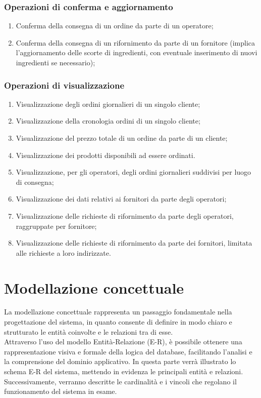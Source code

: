 \documentclass[12pt,a4paper]{article}
\begin{document}
    \subsubsection{Operazioni di conferma e aggiornamento}
    \begin{enumerate}[leftmargin=2.8em,label=\textbf{Op.\arabic*}]
        \item Conferma della consegna di un ordine da parte di un operatore;
        \item Conferma della consegna di un rifornimento da parte di un fornitore (implica l'aggiornamento delle scorte di ingredienti, con eventuale inserimento di nuovi ingredienti se necessario);
    \end{enumerate}

    \subsubsection{Operazioni di visualizzazione}
    \begin{enumerate}[leftmargin=2.8em,label=\textbf{Op.\arabic*}]
        \item Visualizzazione degli ordini giornalieri di un singolo cliente;
        \item Visualizzazione della cronologia ordini di un singolo cliente;
        \item Visualizzazione del prezzo totale di un ordine da parte di un cliente;
        \item Visualizzazione dei prodotti disponibili ad essere ordinati.
        \item Visualizzazione, per gli operatori, degli ordini giornalieri suddivisi per luogo di consegna;
        \item Visualizzazione dei dati relativi ai fornitori da parte degli operatori;
        \item Visualizzazione delle richieste di rifornimento da parte degli operatori, raggruppate per fornitore;
        \item Visualizzazione delle richieste di rifornimento da parte dei fornitori, limitata alle richieste a loro indirizzate.
    \end{enumerate}

    \newpage
    \section{Modellazione concettuale}
    La modellazione concettuale rappresenta un passaggio fondamentale nella progettazione del sistema, in quanto consente di definire in modo chiaro e strutturato le entità coinvolte e le relazioni tra di esse.\\
    Attraverso l'uso del modello Entità-Relazione (E-R), è possibile ottenere una rappresentazione visiva e formale della logica del database, facilitando l'analisi e la comprensione del dominio applicativo. In questa parte verrà illustrato lo schema E-R del sistema, mettendo in evidenza le principali entità e relazioni. Successivamente, verranno descritte le cardinalità e i vincoli che regolano il funzionamento del sistema in esame.
\end{document}
